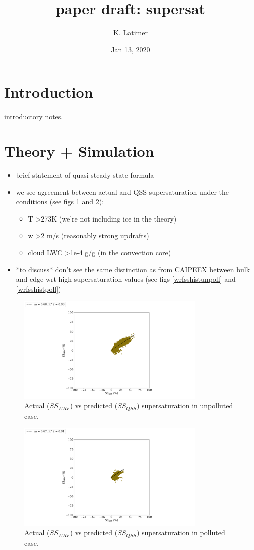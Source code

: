 \documentclass{article}
\title{paper draft: supersat}
\author{K. Latimer}
\date{Jan 13, 2020}
\begin{document}
\maketitle


\section{Introduction}
introductory notes.
\section{Theory + Simulation}
\begin{itemize}
	\item brief statement of quasi steady state formula 
	\item we see agreement between actual and QSS supersaturation under the conditions (see figs \ref{wrfvsqssunpoll} and \ref{wrfvsqsspoll}):
	\begin{itemize}
		\item T \textgreater 273K (we're not including ice in the theory)
		\item w \textgreater 2 m/s (reasonably strong updrafts)
		\item cloud LWC \textgreater 1e-4 g/g (in the convection core)
	\end{itemize}
	\item *to discuss* don't see the same distinction as from CAIPEEX between bulk and edge wrt high supersaturation values (see figs \ref{wrfsshistunpoll} and \ref{wrfsshistpoll})
\end{itemize}
\begin{figure}[ht]
    \centering
    \includegraphics[width=9cm]{mywrf/v28_inclrain_and_vent_qss_vs_fan_Unpolluted_figure.png}
    \caption{Actual ($SS_{WRF}$) vs predicted ($SS_{QSS}$) supersaturation in unpolluted case.}
    \label{wrfvsqssunpoll}
\end{figure}
\begin{figure}[ht]
    \centering
    \includegraphics[width=9cm]{mywrf/v28_inclrain_and_vent_qss_vs_fan_Polluted_figure.png}
    \caption{Actual ($SS_{WRF}$) vs predicted ($SS_{QSS}$) supersaturation in polluted case.}
    \label{wrfvsqsspoll}
\end{figure}
\end{document}
